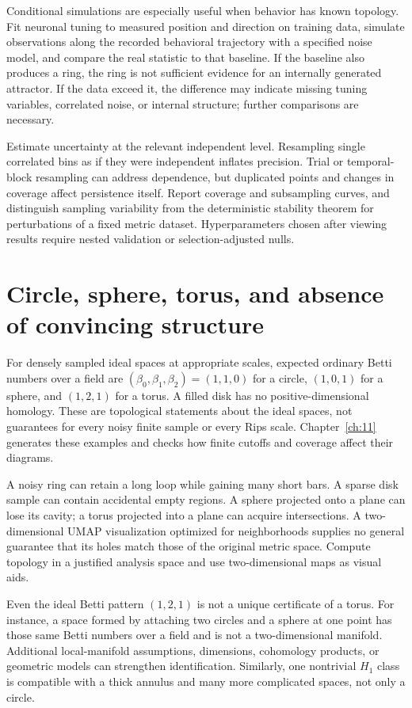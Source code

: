 Conditional simulations are especially useful when behavior has known topology. Fit neuronal tuning to measured position and direction on training data, simulate observations along the recorded behavioral trajectory with a specified noise model, and compare the real statistic to that baseline. If the baseline also produces a ring, the ring is not sufficient evidence for an internally generated attractor. If the data exceed it, the difference may indicate missing tuning variables, correlated noise, or internal structure; further comparisons are necessary.

Estimate uncertainty at the relevant independent level. Resampling single correlated bins as if they were independent inflates precision. Trial or temporal-block resampling can address dependence, but duplicated points and changes in coverage affect persistence itself. Report coverage and subsampling curves, and distinguish sampling variability from the deterministic stability theorem for perturbations of a fixed metric dataset. Hyperparameters chosen after viewing results require nested validation or selection-adjusted nulls.

\section{Circle, sphere, torus, and absence of convincing structure}
For densely sampled ideal spaces at appropriate scales, expected ordinary Betti numbers over a field are $(\beta_0,\beta_1,\beta_2)=(1,1,0)$ for a circle, $(1,0,1)$ for a sphere, and $(1,2,1)$ for a torus. A filled disk has no positive-dimensional homology. These are topological statements about the ideal spaces, not guarantees for every noisy finite sample or every Rips scale. Chapter~\ref{ch:11} generates these examples and checks how finite cutoffs and coverage affect their diagrams.

A noisy ring can retain a long loop while gaining many short bars. A sparse disk sample can contain accidental empty regions. A sphere projected onto a plane can lose its cavity; a torus projected into a plane can acquire intersections. A two-dimensional UMAP visualization optimized for neighborhoods supplies no general guarantee that its holes match those of the original metric space. Compute topology in a justified analysis space and use two-dimensional maps as visual aids.

Even the ideal Betti pattern $(1,2,1)$ is not a unique certificate of a torus. For instance, a space formed by attaching two circles and a sphere at one point has those same Betti numbers over a field and is not a two-dimensional manifold. Additional local-manifold assumptions, dimensions, cohomology products, or geometric models can strengthen identification. Similarly, one nontrivial $H_1$ class is compatible with a thick annulus and many more complicated spaces, not only a circle.

